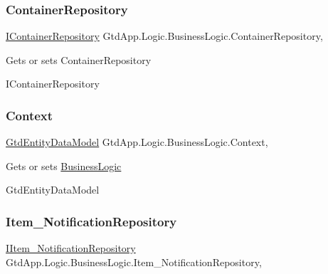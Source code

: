 \subsubsection{\texorpdfstring{Container\+Repository}{ContainerRepository}}
{\footnotesize\ttfamily \mbox{\hyperlink{interface_gtd_app_1_1_repository_1_1_interfaces_1_1_i_container_repository}{I\+Container\+Repository}} Gtd\+App.\+Logic.\+Business\+Logic.\+Container\+Repository\hspace{0.3cm}{\ttfamily [get]}, {\ttfamily [set]}}



Gets or sets Container\+Repository 

I\+Container\+Repository\mbox{\label{class_gtd_app_1_1_logic_1_1_business_logic_a874b4e829adf02e8bbf80cdef657c81d}} 
\subsubsection{\texorpdfstring{Context}{Context}}
{\footnotesize\ttfamily \mbox{\hyperlink{class_gtd_app_1_1_data_1_1_gtd_entity_data_model}{Gtd\+Entity\+Data\+Model}} Gtd\+App.\+Logic.\+Business\+Logic.\+Context\hspace{0.3cm}{\ttfamily [get]}, {\ttfamily [set]}}



Gets or sets \mbox{\hyperlink{class_gtd_app_1_1_logic_1_1_business_logic}{Business\+Logic}} 

Gtd\+Entity\+Data\+Model\mbox{\label{class_gtd_app_1_1_logic_1_1_business_logic_a1f6fdb6a8c3e4d590eb6c539abe4d24a}} 
\subsubsection{\texorpdfstring{Item\+\_\+\+Notification\+Repository}{Item\_NotificationRepository}}
{\footnotesize\ttfamily \mbox{\hyperlink{interface_gtd_app_1_1_repository_1_1_interfaces_1_1_i_item___notification_repository}{I\+Item\+\_\+\+Notification\+Repository}} Gtd\+App.\+Logic.\+Business\+Logic.\+Item\+\_\+\+Notification\+Repository\hspace{0.3cm}{\ttfamily [get]}, {\ttfamily [set]}}



